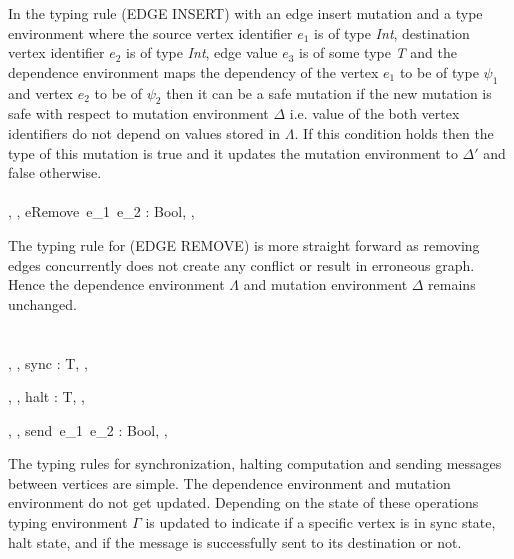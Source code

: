 \smallskip

In the typing rule (EDGE INSERT) with an edge insert mutation and a type environment where the source vertex identifier $e_1$ is of type \emph{Int}, destination vertex identifier $e_2$ is of type \emph{Int}, edge value $e_3$ is of some type \emph{T} and the dependence environment maps the dependency of the vertex $e_1$ to be of type $\psi_1$ and vertex $e_2$ to be of $\psi_2$ then it can be a safe mutation if the new mutation is safe with respect to mutation environment $\Delta$ i.e. value of the both vertex identifiers do not depend on values stored in $\Lambda$. If this condition holds then the type of this mutation is true and it updates the mutation environment to $\Delta'$ and false otherwise.   
\ \\
\ \\ 
    {\Gamma, \Lambda, \Delta \vdash eRemove\ e_1\ e_2 : Bool, \Lambda, \Delta}

\smallskip

The typing rule for (EDGE REMOVE) is more straight forward as removing edges concurrently does not create any conflict or result in erroneous graph. Hence the dependence environment $\Lambda$ and mutation environment $\Delta$ remains unchanged.\\
\ \\
\ \\         
    {\Gamma, \Lambda, \Delta \vdash sync : T, \Lambda, \Delta}
    
    {\Gamma, \Lambda, \Delta \vdash halt : T, \Lambda, \Delta}
    
    {\Gamma, \Lambda, \Delta \vdash send\ e_1\ e_2 : Bool, \Lambda, \Delta}

 \smallskip

The typing rules for synchronization, halting computation and sending messages
between vertices are simple. The dependence environment and mutation environment
do not get updated. Depending on the state of these operations typing
environment $\Gamma$ is updated to indicate if a specific vertex is in sync
state, halt state, and if the message is successfully sent to its destination or
not.\\
\ \\
\ \\    


